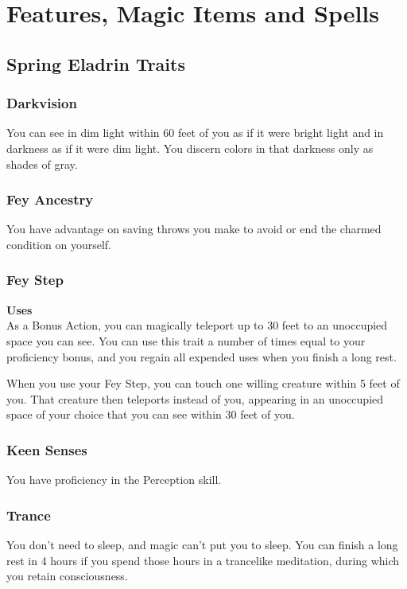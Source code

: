 \documentclass[letterpaper,openany,oneside,twocolumn]{book}
\begin{document}
\onecolumn


\rendercharactersheet

\renderbackgroundsheet

\renderspellsheet


\restoregeometry
\twocolumn

\chapter*{Features, Magic Items and Spells}
\section*{Spring Eladrin Traits}
\subsection*{Darkvision}
You can see in dim light within 60 feet of you as if it were bright light and in darkness as if it were dim light. You discern colors in that darkness only as shades of gray.
\subsection*{Fey Ancestry}
You have advantage on saving throws you make to avoid or end the charmed condition on yourself.
\subsection*{Fey Step}
\textbf{ Uses}\\
As a Bonus Action, you can magically teleport up to 30 feet to an unoccupied space you can see. You can use this trait a number of times equal to your proficiency bonus, and you regain all expended uses when you finish a long rest.

When you use your Fey Step, you can touch one willing creature within 5 feet of you. That creature then teleports instead of you, appearing in an unoccupied space of your choice that you can see within 30 feet of you.
\subsection*{Keen Senses}
You have proficiency in the Perception skill.
\subsection*{Trance}
You don't need to sleep, and magic can't put you to sleep. You can finish a long rest in 4 hours if you spend those hours in a trancelike meditation, during which you retain consciousness.
\end{document}
